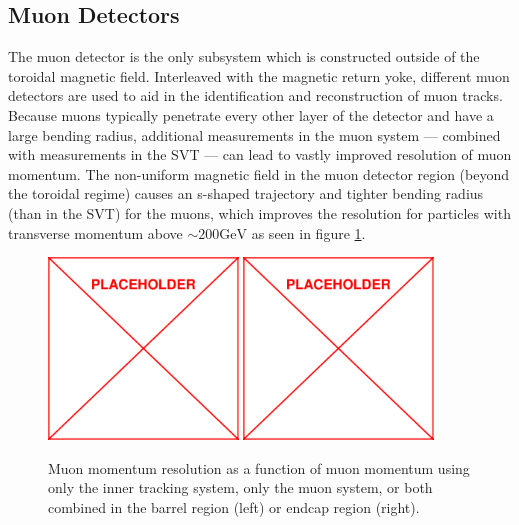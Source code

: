 \subsection{Muon Detectors}
\label{subsec:muondetector}
The muon detector is the only subsystem which is constructed outside of the toroidal magnetic field. Interleaved with the magnetic return yoke, different muon detectors are used to aid in the identification and reconstruction of muon tracks. Because muons typically penetrate every other layer of the detector and have a large bending radius, additional measurements in the muon system --- combined with measurements in the SVT --- can lead to vastly improved resolution of muon momentum. The non-uniform magnetic field in the muon detector region (beyond the toroidal regime) causes an s-shaped trajectory and tighter bending radius (than in the SVT) for the muons, which improves the resolution for particles with transverse momentum above $\sim200\text{GeV}$ as seen in figure \ref{fig:muonSigma}.
 \begin{figure}
	\centering
	\includegraphics[width=0.45\textwidth]{figs/placeholder}
	\includegraphics[width=0.45\textwidth]{figs/placeholder}
	\caption{Muon momentum resolution as a function of muon momentum using only the inner tracking system, only the muon system, or both combined in the barrel region (left) or endcap region (right).}
	\label{fig:muonSigma}
\end{figure}

